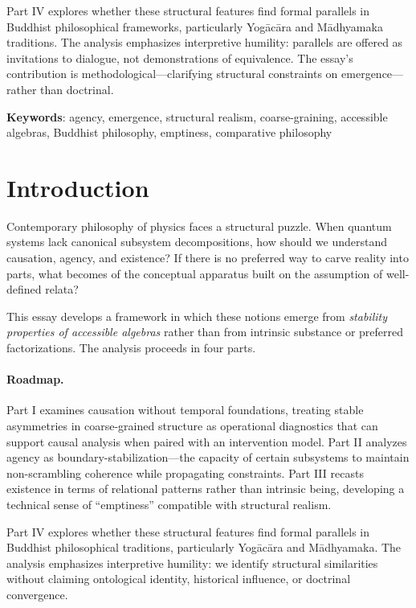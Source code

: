 \documentclass[12pt,a4paper,openany]{book}
\begin{document}
Part IV explores whether these structural features find formal parallels in Buddhist philosophical frameworks, particularly Yog\=ac\=ara and M\=adhyamaka traditions. The analysis emphasizes interpretive humility: parallels are offered as invitations to dialogue, not demonstrations of equivalence. The essay's contribution is methodological—clarifying structural constraints on emergence—rather than doctrinal.

\medskip

\noindent\textbf{Keywords}: agency, emergence, structural realism, coarse-graining, accessible algebras, Buddhist philosophy, emptiness, comparative philosophy


\tableofcontents

\section{Introduction}
\label{C-sec:intro}

Contemporary philosophy of physics faces a structural puzzle. When quantum systems lack canonical subsystem decompositions, how should we understand causation, agency, and existence? If there is no preferred way to carve reality into parts, what becomes of the conceptual apparatus built on the assumption of well-defined relata?

This essay develops a framework in which these notions emerge from \emph{stability properties of accessible algebras} rather than from intrinsic substance or preferred factorizations. The analysis proceeds in four parts.

\paragraph{Roadmap.}
Part I examines causation without temporal foundations, treating stable asymmetries in coarse-grained structure as operational diagnostics that can support causal analysis when paired with an intervention model. Part II analyzes agency as boundary-stabilization—the capacity of certain subsystems to maintain non-scrambling coherence while propagating constraints. Part III recasts existence in terms of relational patterns rather than intrinsic being, developing a technical sense of ``emptiness'' compatible with structural realism.

Part IV explores whether these structural features find formal parallels in Buddhist philosophical traditions, particularly Yog\=ac\=ara and M\=adhyamaka. The analysis emphasizes interpretive humility: we identify structural similarities without claiming ontological identity, historical influence, or doctrinal convergence.
\end{document}
